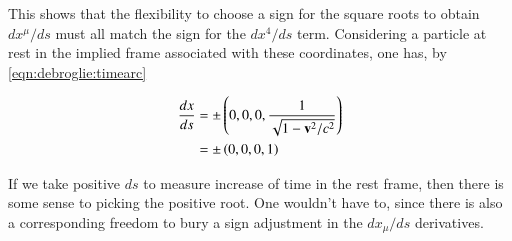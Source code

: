 This shows that the flexibility to choose a sign for the square roots to obtain $dx^\mu/ds$ must all match the sign for the $dx^4/ds$ term.  Considering a particle at rest in the implied frame associated with these coordinates, one has, by \ref{eqn:debroglie:timearc}

\begin{align*}
\frac{dx}{ds} 
&= \pm \left(0, 0, 0, \frac{1}{\sqrt{1 - \mathbf{v}^2/c^2}} \right) \\
&= \pm \left(0, 0, 0, 1 \right) \\
\end{align*}

If we take positive $ds$ to measure increase of time in the rest frame, then there is some sense to picking the positive root.  One
wouldn't have to, since there is also a corresponding freedom to bury a sign adjustment in the $dx_\mu/ds$ derivatives.

%
%

%
